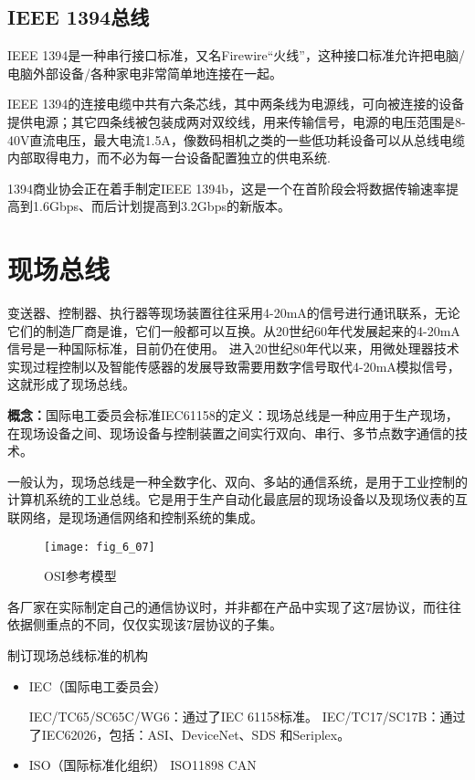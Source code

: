 \subsection{IEEE 1394总线}

IEEE 1394是一种串行接口标准，又名Firewire“火线”，这种接口标准允许把电脑/电脑外部设备/各种家电非常简单地连接在一起。

IEEE 1394的连接电缆中共有六条芯线，其中两条线为电源线，可向被连接的设备提供电源；其它四条线被包装成两对双绞线，用来传输信号，电源的电压范围是8-40V直流电压，最大电流1.5A，像数码相机之类的一些低功耗设备可以从总线电缆内部取得电力，而不必为每一台设备配置独立的供电系统.

1394商业协会正在着手制定IEEE 1394b，这是一个在首阶段会将数据传输速率提高到1.6Gbps、而后计划提高到3.2Gbps的新版本。



\section{现场总线}


变送器、控制器、执行器等现场装置往往采用4-20mA的信号进行通讯联系，无论它们的制造厂商是谁，它们一般都可以互换。从20世纪60年代发展起来的4-20mA信号是一种国际标准，目前仍在使用。
进入20世纪80年代以来，用微处理器技术实现过程控制以及智能传感器的发展导致需要用数字信号取代4-20mA模拟信号，这就形成了现场总线。

\textbf{概念：}国际电工委员会标准IEC61158的定义：现场总线是一种应用于生产现场，在现场设备之间、现场设备与控制装置之间实行双向、串行、多节点数字通信的技术。

一般认为，现场总线是一种全数字化、双向、多站的通信系统，是用于工业控制的计算机系统的工业总线。它是用于生产自动化最底层的现场设备以及现场仪表的互联网络，是现场通信网络和控制系统的集成。

\begin{figure}
  \centering
  \texttt{[image: fig\_6\_07]}
  \caption{OSI参考模型}\label{fig_6_07}
\end{figure}


各厂家在实际制定自己的通信协议时，并非都在产品中实现了这7层协议，而往往依据侧重点的不同，仅仅实现该7层协议的子集。



制订现场总线标准的机构

\begin{itemize}

\item IEC（国际电工委员会）

   IEC/TC65/SC65C/WG6：通过了IEC 61158标准。
   IEC/TC17/SC17B：通过了IEC62026，包括：ASI、DeviceNet、SDS 和Seriplex。


\item ISO（国际标准化组织）
      ISO11898    CAN


\end{itemize}


